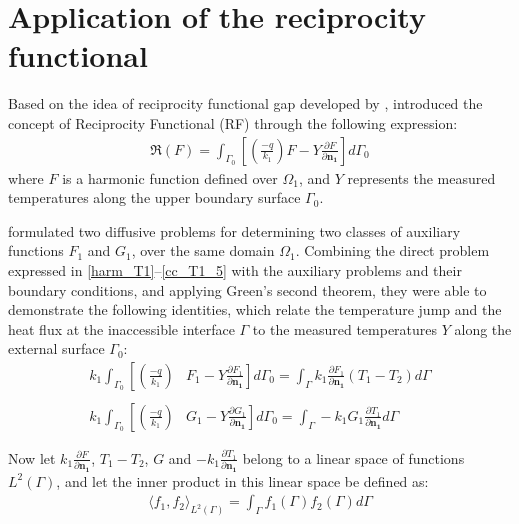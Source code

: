 \documentclass[12pt]{CHT-20}
\begin{document}
\section*{Application of the reciprocity functional}

Based on the idea of reciprocity functional gap developed by \cite{artigo_andrieux}, \cite{reciproc_3} introduced the concept of Reciprocity Functional (RF) through the following expression:
\begin{align}
\Re(F) = \int_{\Gamma_0}\left[\left(\frac{-q}{k_1}\right)F - Y\frac{\partial F}{\partial\mathbf{n_1}}\right]d\Gamma_0
\label{def_funcional_reciprocidade}
\end{align}
where $F$ is a harmonic function defined over $\Omega_1$, and $Y$ represents the measured temperatures along the upper boundary surface $\Gamma_0$.

\cite{reciproc_3} formulated two diffusive problems for determining two classes of auxiliary functions $F_1$ and $G_1$, over the same domain $\Omega_1$. Combining the direct problem expressed in \eqref{harm_T1}--\eqref{cc_T1_5} with the auxiliary problems and their boundary conditions, and applying Green's second theorem, they were able to demonstrate the following identities, which relate the temperature jump and the heat flux at the inaccessible interface $\Gamma$ to the measured temperatures $Y$ along the external surface $\Gamma_0$:
\begin{align}
k_1\int_{\Gamma_0}\left[\left(\frac{-q}{k_1}\right)\right. & \left.F_1 - Y\frac{\partial F_1}{\partial\mathbf{n_1}}\right]d\Gamma_0
= \int_\Gamma k_1 \frac{\partial F_1}{\partial\mathbf{n_1}}\left(T_1 - T_2\right)d\Gamma
\label{identidade_T} \\ \nonumber \\
k_1\int_{\Gamma_0}\left[\left(\frac{-q}{k_1}\right)\right. & \left.G_1 -  Y\frac{\partial G_1}{\partial\mathbf{n_1}}\right]d\Gamma_0
= \int_\Gamma -k_1 G_1 \frac{\partial T_1}{\partial\mathbf{n_1}}d\Gamma
\label{identidade_q}
\end{align}

Now let $k_1 \frac{\partial F}{\partial\mathbf{n_1}}$, $T_1 - T_2$, $G$ and $-k_1 \frac{\partial T_1}{\partial\mathbf{n_1}}$ belong to a linear space of functions $L^2(\Gamma)$, and let the inner product in this linear space be defined as:
\begin{align}
\langle f_1, f_2\rangle_{L^2(\Gamma)} = \int_\Gamma f_1(\Gamma) f_2(\Gamma) d\Gamma \label{definicao_innner_product}
\end{align} 
\end{document}
